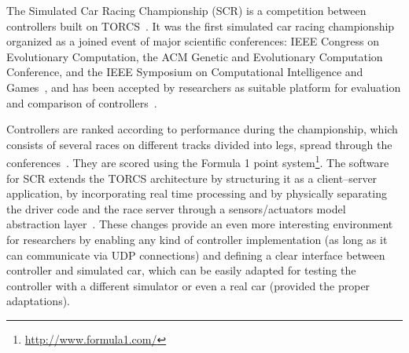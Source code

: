 The Simulated Car Racing Championship (SCR) is a competition between controllers built on TORCS~\cite{SCR}. It was the first simulated car racing championship organized as a joined event of major scientific conferences: IEEE Congress on Evolutionary Computation, the ACM Genetic and Evolutionary Computation Conference, and the IEEE Symposium on Computational Intelligence and Games~\cite{2009}, and has been accepted by researchers as suitable platform for evaluation and comparison of controllers~\cite{SIMUTORCS}.

Controllers are ranked according to performance during the championship, which consists of several races on different tracks divided into legs, spread through the conferences~\cite{2009}. They are scored using the Formula 1 point system\footnote{\url{http://www.formula1.com/}}. The software for SCR extends the TORCS architecture by structuring it as a client–server application, by incorporating real time processing and by physically separating the driver code and the race server through a sensors/actuators model abstraction layer~\cite{2009}. These changes provide an even more interesting environment for researchers by enabling any kind of controller implementation (as long as it can communicate via UDP connections) and defining a clear interface between controller and simulated car, which can be easily adapted for testing the controller with a different simulator or even a real car (provided the proper adaptations).





